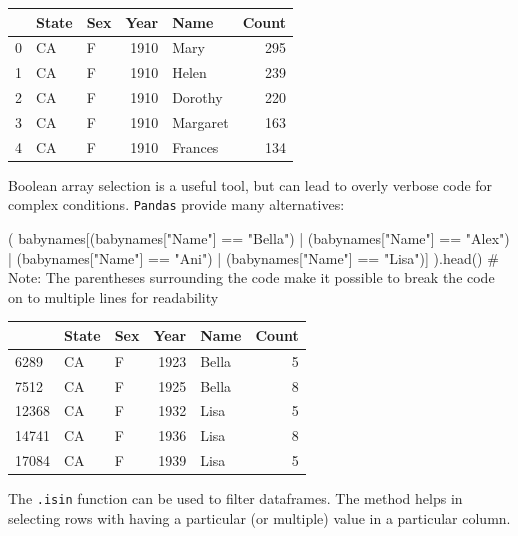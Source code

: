 \documentclass[
  letterpaper,
  DIV=11,
  numbers=noendperiod]{scrreprt}
\newenvironment{Shaded}{\begin{snugshade}}{\end{snugshade}}
\newcommand{\CommentTok}[1]{\textcolor[rgb]{0.37,0.37,0.37}{#1}}
\newcommand{\NormalTok}[1]{\textcolor[rgb]{0.00,0.23,0.31}{#1}}
\newcommand{\OperatorTok}[1]{\textcolor[rgb]{0.37,0.37,0.37}{#1}}
\newcommand{\StringTok}[1]{\textcolor[rgb]{0.13,0.47,0.30}{#1}}
\begin{document}
\begin{tabular}{lllrlr}
\toprule
{} & State & Sex &  Year &      Name &  Count \\
\midrule
0 &    CA &   F &  1910 &      Mary &    295 \\
1 &    CA &   F &  1910 &     Helen &    239 \\
2 &    CA &   F &  1910 &   Dorothy &    220 \\
3 &    CA &   F &  1910 &  Margaret &    163 \\
4 &    CA &   F &  1910 &   Frances &    134 \\
\bottomrule
\end{tabular}

Boolean array selection is a useful tool, but can lead to overly verbose
code for complex conditions. \texttt{Pandas} provide many alternatives:

\begin{Shaded}
\begin{Highlighting}[]
\NormalTok{(}
\NormalTok{    babynames[(babynames[}\StringTok{"Name"}\NormalTok{] }\OperatorTok{==} \StringTok{"Bella"}\NormalTok{) }\OperatorTok{|} 
\NormalTok{              (babynames[}\StringTok{"Name"}\NormalTok{] }\OperatorTok{==} \StringTok{"Alex"}\NormalTok{) }\OperatorTok{|}
\NormalTok{              (babynames[}\StringTok{"Name"}\NormalTok{] }\OperatorTok{==} \StringTok{"Ani"}\NormalTok{) }\OperatorTok{|}
\NormalTok{              (babynames[}\StringTok{"Name"}\NormalTok{] }\OperatorTok{==} \StringTok{"Lisa"}\NormalTok{)]}
\NormalTok{).head()}
\CommentTok{\# Note: The parentheses surrounding the code make it possible to break the code on to multiple lines for readability}
\end{Highlighting}
\end{Shaded}

\begin{tabular}{lllrlr}
\toprule
{} & State & Sex &  Year &   Name &  Count \\
\midrule
6289  &    CA &   F &  1923 &  Bella &      5 \\
7512  &    CA &   F &  1925 &  Bella &      8 \\
12368 &    CA &   F &  1932 &   Lisa &      5 \\
14741 &    CA &   F &  1936 &   Lisa &      8 \\
17084 &    CA &   F &  1939 &   Lisa &      5 \\
\bottomrule
\end{tabular}

The \texttt{.isin} function can be used to filter dataframes. The method
helps in selecting rows with having a particular (or multiple) value in
a particular column.
\end{document}
